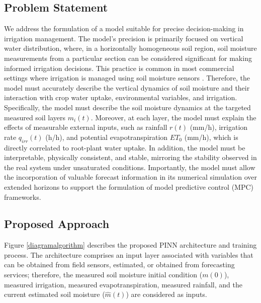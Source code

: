 \documentclass[pdflatex,sn-nature]{sn-jnl}%
\theoremstyle{thmstyleone}%
\theoremstyle{thmstyletwo}%
\theoremstyle{thmstylethree}%
\begin{document}
\subsection{Problem Statement}
We address the formulation of a model suitable for precise decision-making in irrigation management. The model's precision is primarily focused on vertical water distribution, where, in a horizontally homogeneous soil region, soil moisture measurements from a particular section can be considered significant for making informed irrigation decisions. This practice is common in most commercial settings where irrigation is managed using soil moisture sensors \cite{Rossini2021, Mandal2025}.
Therefore, the model must accurately describe the vertical dynamics of soil moisture and their interaction with crop water uptake, environmental variables, and irrigation. Specifically, the model must describe the soil moisture dynamics at the targeted measured soil layers $m_i(t)$. 
Moreover, at each layer, the model must explain the effects of measurable external inputs, such as rainfall $r(t) $ (\si{mm/h}), irrigation rate $ q_{irr}(t)$ (\si{h/h}), and potential evapotranspiration $ET_0$ (\si{mm/h}), which is directly correlated to root-plant water uptake.
In addition, the model must be interpretable, physically consistent, and stable, mirroring the stability observed in the real system under unsaturated conditions.
Importantly, the model must allow the incorporation of valuable forecast information in its numerical simulation over extended horizons to support the formulation of model predictive control (MPC) frameworks.


\subsection{Proposed Approach}

Figure \ref{diagramalgorithm} describes the proposed PINN architecture and training process. The architecture comprises an input layer associated with variables that can be obtained from field sensors, estimated, or obtained from forecasting services; therefore, the measured soil moisture initial condition ($m(0)$), measured irrigation, measured evapotranspiration, measured rainfall, and the current estimated soil moisture ($\hat{m}(t)$) are considered as inputs.
\end{document}
